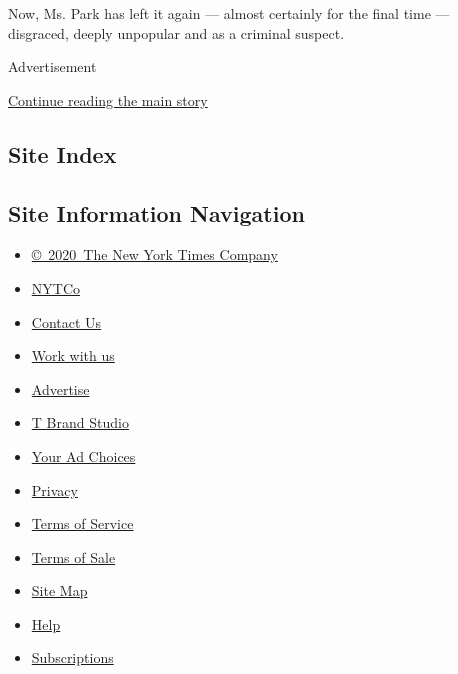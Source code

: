 Now, Ms. Park has left it again --- almost certainly for the final time
--- disgraced, deeply unpopular and as a criminal suspect.

Advertisement

\protect\hyperlink{after-bottom}{Continue reading the main story}

\hypertarget{site-index}{%
\subsection{Site Index}\label{site-index}}

\hypertarget{site-information-navigation}{%
\subsection{Site Information
Navigation}\label{site-information-navigation}}

\begin{itemize}
\tightlist
\item
  \href{https://help.nytimes3xbfgragh.onion/hc/en-us/articles/115014792127-Copyright-notice}{©~2020~The
  New York Times Company}
\end{itemize}

\begin{itemize}
\tightlist
\item
  \href{https://www.nytco.com/}{NYTCo}
\item
  \href{https://help.nytimes3xbfgragh.onion/hc/en-us/articles/115015385887-Contact-Us}{Contact
  Us}
\item
  \href{https://www.nytco.com/careers/}{Work with us}
\item
  \href{https://nytmediakit.com/}{Advertise}
\item
  \href{http://www.tbrandstudio.com/}{T Brand Studio}
\item
  \href{https://www.nytimes3xbfgragh.onion/privacy/cookie-policy\#how-do-i-manage-trackers}{Your
  Ad Choices}
\item
  \href{https://www.nytimes3xbfgragh.onion/privacy}{Privacy}
\item
  \href{https://help.nytimes3xbfgragh.onion/hc/en-us/articles/115014893428-Terms-of-service}{Terms
  of Service}
\item
  \href{https://help.nytimes3xbfgragh.onion/hc/en-us/articles/115014893968-Terms-of-sale}{Terms
  of Sale}
\item
  \href{https://spiderbites.nytimes3xbfgragh.onion}{Site Map}
\item
  \href{https://help.nytimes3xbfgragh.onion/hc/en-us}{Help}
\item
  \href{https://www.nytimes3xbfgragh.onion/subscription?campaignId=37WXW}{Subscriptions}
\end{itemize}
